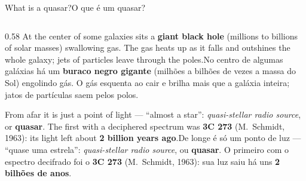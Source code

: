 \documentclass[aspectratio=169,11pt]{beamer}
\newcommand{\tr}[2]{\ifEN#2\else#1\fi}
\newcommand{\bnum}[1]{\textbf{\textcolor{mTeal}{#1}}}
\begin{document}
\begin{frame}{\tr{O que é um quasar?}{What is a quasar?}}
  \begin{columns}[T]
    \begin{column}{0.58\textwidth}
      \small
      \tr{No centro de algumas galáxias há um \bnum{buraco negro gigante} (milhões a bilhões de
      vezes a massa do Sol) engolindo gás. O gás esquenta ao cair e brilha mais que a galáxia
      inteira; jatos de partículas saem pelos polos.}{At the center of some galaxies sits a
      \bnum{giant black hole} (millions to billions of solar masses) swallowing gas. The gas heats
      up as it falls and outshines the whole galaxy; jets of particles leave through the poles.}
      \smallskip

      \tr{De longe é só um ponto de luz --- ``quase uma estrela'': \emph{quasi-stellar radio
      source}, ou \bnum{quasar}. O primeiro com o espectro decifrado foi o \textbf{3C 273}
      (M.~Schmidt, 1963): sua luz saiu há uns \bnum{2 bilhões de anos}.}{From afar it is just a
      point of light --- ``almost a star'': \emph{quasi-stellar radio source}, or
      \bnum{quasar}. The first with a deciphered spectrum was \textbf{3C 273} (M.~Schmidt,
      1963): its light left about \bnum{2 billion years ago}.}
      \smallskip


\end{column}
\end{columns}
\end{frame}
\end{document}
